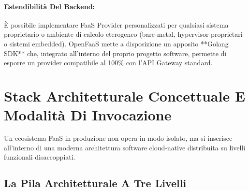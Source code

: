 \documentclass[11pt, a4paper]{article}
\begin{document}
\paragraph{Estendibilità Del Backend:} È possibile implementare FaaS Provider personalizzati per qualsiasi sistema proprietario o ambiente di calcolo eterogeneo (bare-metal, hypervisor proprietari o sistemi embedded). OpenFaaS mette a disposizione un apposito **Golang SDK** che, integrato all'interno del proprio progetto software, permette di esporre un provider compatibile al 100\% con l'API Gateway standard.

\newpage


\section{Stack Architetturale Concettuale E Modalità Di Invocazione}

Un ecosistema FaaS in produzione non opera in modo isolato, ma si inserisce all'interno di una moderna architettura software cloud-native distribuita su livelli funzionali disaccoppiati.

\subsection{La Pila Architetturale A Tre Livelli}

\end{document}
